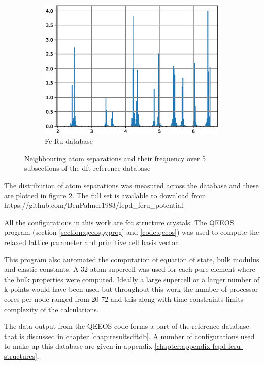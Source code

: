 \begin{figure}
\begin{subfigure}{.49\textwidth}
  \includegraphics[width=.99\linewidth]{chapters/potentials_fe_pd_ru/neighbour_distances/db_feru_neighbours.eps}  
  \caption{Fe-Ru database}
  \label{fig:ferudb}
\end{subfigure}
\caption{Neighbouring atom separations and their frequency over 5 subsections of the \acrshort{dft} reference database}
\label{fig:dbneighbourseparations}
\end{figure}

The distribution of atom separations was measured across the database and these are plotted in figure \ref{fig:dbneighbourseparations}.  The full set is available to download from https://github.com/BenPalmer1983/fepd\_feru\_potential.

All the configurations in this work are \acrshort{fcc} structure crystals.  The QEEOS program (section \ref{section:qeeospyprog} and \ref{code:qeeos}) was used to compute the relaxed lattice parameter and primitive cell basis vector.

This program also automated the computation of equation of state, bulk modulus and elastic constants.  A 32 atom supercell was used for each pure element where the bulk properties were computed.  Ideally a large supercell or a larger number of k-points would have been used but throughout this work the number of processor cores per node ranged from 20-72 and this along with time constraints limits complexity of the calculations.

The data output from the QEEOS code forms a part of the reference database that is discussed in chapter \ref{chap:resultsdftdb}.  A number of configurations used to make up this database are given in appendix \ref{chapter:appendix-fepd-feru-structures}.





